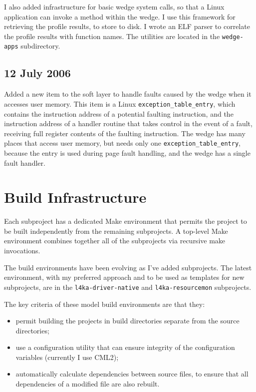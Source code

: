\documentclass[10pt,a4paper]{article}
\newcommand{\code}[1]{\texttt{#1}}
\newcommand{\dir}[1]{\texttt{#1}}
\begin{document}
I also added infrastructure for basic wedge system calls, so that a
Linux application can invoke a method within the wedge.  I use this
framework for retrieving the profile results, to store to disk.  I
wrote an ELF parser to correlate the profile results with
function names.  The utilities are located in the \dir{wedge-apps}
subdirectory.

\subsection*{12 July 2006}

Added a new item to the soft layer to handle faults caused by the wedge
when it accesses user memory.  This item is a Linux
\code{exception\_table\_entry}, which contains the instruction address
of a potential faulting instruction, and the instruction address of a
handler routine that takes control in the event of a fault, receiving
full register contents of the faulting instruction.  The wedge has
many places that access user memory, but needs only one
\code{exception\_table\_entry}, because the entry is used during page
fault handling, and the wedge has a single fault handler.


\section{Build Infrastructure}

Each subproject has a dedicated Make environment that permits the
project to be built independently from the remaining subprojects.  A
top-level Make environment combines together all of the subprojects via
recursive make invocations.

The build environments have been evolving as I've added subprojects.
The latest environment, with my preferred approach and to be used as
templates for new subprojects, are in the \dir{l4ka-driver-native} and
\dir{l4ka-resourcemon} subprojects.

The key criteria of these model build environments are that they:
\begin{itemize}
\item permit building the projects in build directories separate from
the source directories;
\item use a configuration utility that can ensure integrity of the
configuration variables (currently I use CML2);
\item automatically calculate dependencies between source files, to
ensure that all dependencies of a modified file are also rebuilt.
\end{itemize}
\end{document}
